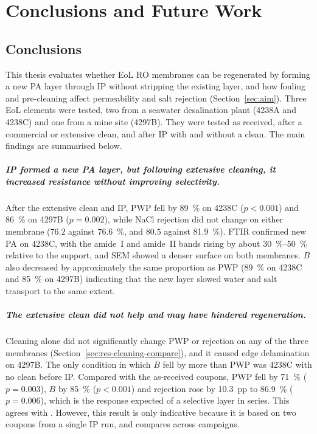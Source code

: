 \chapter{Conclusions and Future Work}
\label{ch:conclusion}

\section{Conclusions}
\label{sec:conclusions}
This thesis evaluates whether EoL RO membranes can be regenerated by forming a new PA layer through IP without stripping the existing layer, and how fouling and pre-cleaning affect permeability and salt rejection (Section~\ref{sec:aim}). Three EoL elements were tested, two from a seawater desalination plant (4238A and 4238C) and one from a mine site (4297B). They were tested as received, after a commercial or extensive clean, and after IP with and without a clean. The main findings are summarised below.

\paragraph{IP formed a new PA layer, but following extensive cleaning, it increased resistance without improving selectivity.}
After the extensive clean and IP, PWP fell by \qty{89}{\percent} on 4238C ($p < 0.001$) and \qty{86}{\percent} on 4297B ($p = 0.002$), while NaCl rejection did not change on either membrane ($76.2$ against \qty{76.6}{\percent}, and $80.5$ against \qty{81.9}{\percent}). FTIR confirmed new PA on 4238C, with the amide~I and amide~II bands rising by about \qtyrange{30}{50}{\percent} relative to the support, and SEM showed a denser surface on both membranes. $B$ also decreased by approximately the same proportion as PWP (\qty{89}{\percent} on 4238C and \qty{85}{\percent} on 4297B) indicating that the new layer slowed water and salt transport to the same extent.

\paragraph{The extensive clean did not help and may have hindered regeneration.}
Cleaning alone did not significantly change PWP or rejection on any of the three membranes (Section~\ref{sec:res-cleaning-compare}), and it caused edge delamination on 4297B. The only condition in which $B$ fell by more than PWP was 4238C with no clean before IP. Compared with the as-received coupons, PWP fell by \qty{71}{\percent} ($p = 0.003$), $B$ by \qty{85}{\percent} ($p < 0.001$) and rejection rose by \qty{10.3}{pp} to \qty{86.9}{\percent} ($p = 0.006$), which is the response expected of a selective layer in series. This agrees with \citet{Ogbe2026}. However, this result is only indicative because it is based on two coupons from a single IP run, and compares across campaigns.

